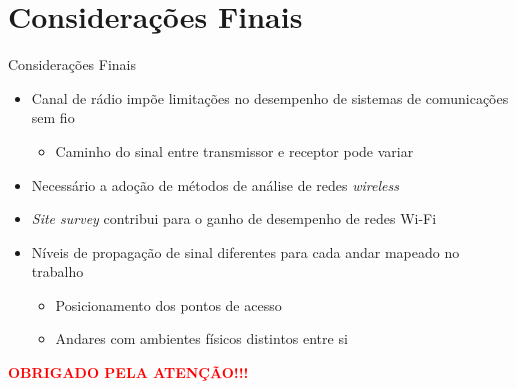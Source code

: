 \documentclass[aspectratio=169,12pt]{beamer}
\begin{document}
\section{Considerações Finais}
\begin{frame}{Considerações Finais}
	\begin{block}{}
		\begin{itemize}
			\item Canal de rádio impõe limitações no desempenho de sistemas de comunicações sem fio
				\begin{itemize}
					\item Caminho do sinal entre transmissor e receptor pode variar
				\end{itemize}
			\item Necessário a adoção de métodos de análise de redes \textit{wireless}
			\item \textit{Site survey} contribui para o ganho de desempenho de redes Wi-Fi
			\item Níveis de propagação de sinal diferentes para cada andar mapeado no trabalho
			\begin{itemize}
				\item Posicionamento dos pontos de acesso
				\item Andares com ambientes físicos distintos entre si
			\end{itemize}
		\end{itemize}
	\end{block}
\end{frame}
\begin{frame}[plain,c]
	\vfill
	\centering
	{\huge\textcolor{red}{\textbf{OBRIGADO PELA ATENÇÃO!!!}}}
	\vfill
\end{frame}
\end{document}
